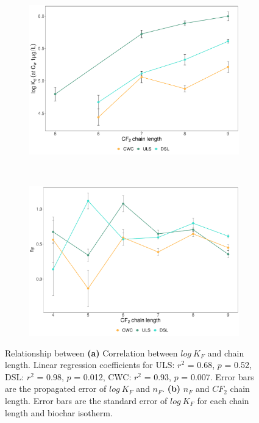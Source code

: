 \begin{figure}[tbh]
    \centering
    \begin{subfigure}[t]{0.45\textwidth}
        \centering
        \includegraphics[width=\textwidth]{R/figs/chain_length_Kd1ugL_plot.pdf}
        \caption{}
        \label{subfig:chainlength}
    \end{subfigure}%
    ~ 
    \begin{subfigure}[t]{0.45\textwidth}
        \centering
        \includegraphics[width=\textwidth]{R/figs/n_KF.pdf}
        \caption{}
        \label{subfig:n}
    \end{subfigure}
    \label{fig:chain_length_n}
    \caption{Relationship between \textbf{(a)} Correlation between $log~K_F$ and chain length. Linear regression coefficients for ULS: $r^2$ = 0.68, $p$ = 0.52, DSL: $r^2$ = 0.98, $p$ = 0.012, CWC: $r^2$ = 0.93, $p$ = 0.007. Error bars are the propagated error of $log~K_F$ and $n_F$. \textbf{(b)} $n_F$ and $CF_2$ chain length. Error bars are the standard error of $log~K_F$ for each chain length and biochar isotherm.}
\end{figure}

